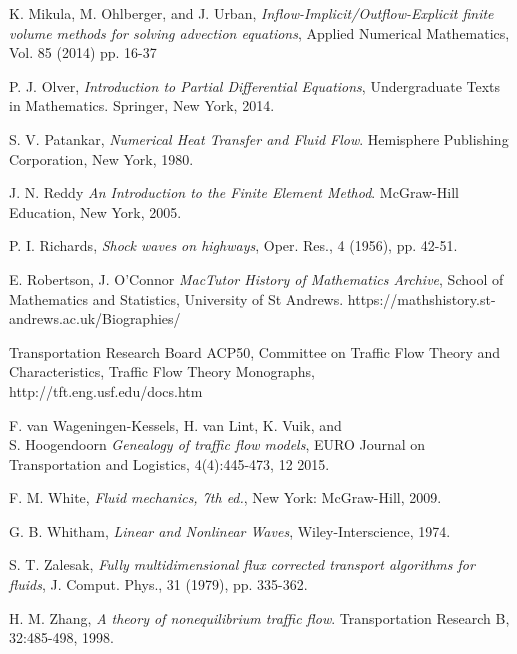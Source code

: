 \documentclass[../include.tex]{subfiles}
\begin{document}
\begin{thebibliography}{99}
	 {\sc K. Mikula, M. Ohlberger, and J. Urban},
	{\em Inflow-Implicit/Outflow-Explicit finite volume methods for solving advection equations}, Applied Numerical Mathematics, Vol. 85 (2014) pp. 16-37

	 {\sc P. J. Olver},
	{\em Introduction to Partial Differential Equations}, Undergraduate Texts in Mathematics. Springer, New York, 2014.

	 {\sc S. V. Patankar},
	{\em Numerical Heat Transfer and Fluid Flow}. Hemisphere Publishing Corporation, New York, 1980.

	 {\sc J. N. Reddy}
	{\em An Introduction to the Finite Element Method}. McGraw-Hill Education, New York, 2005.

	 {\sc P. I. Richards},
	{\em Shock waves on highways}, Oper. Res., 4 (1956), pp. 42-51.

	  {\sc E. Robertson, J. O'Connor}
	{\em MacTutor History of Mathematics Archive}, School of Mathematics and Statistics, University of St Andrews. https://mathshistory.st-andrews.ac.uk/Biographies/

	 Transportation Research Board ACP50, Committee on Traffic Flow Theory and Characteristics, Traffic Flow Theory Monographs,
	http://tft.eng.usf.edu/docs.htm

	 {\sc F. van Wageningen-Kessels, H. van Lint, K. Vuik, and \\S. Hoogendoorn}
	{\em Genealogy of traffic flow models}, EURO Journal on Transportation and Logistics, 4(4):445-473, 12 2015.

	 {\sc F. M. White},
	{\em Fluid mechanics, 7th ed.}, New York: McGraw-Hill, 2009.

	 {\sc G. B. Whitham},
	{\em Linear and Nonlinear Waves}, Wiley-Interscience, 1974.

	 {\sc S. T. Zalesak},
	{\em Fully multidimensional flux corrected transport algorithms for fluids}, J. Comput. Phys., 31 (1979), pp. 335-362.

	 {\sc H. M. Zhang},
	{\em A theory of nonequilibrium traffic flow}. Transportation Research B, 32:485-498, 1998.
\end{thebibliography}
\end{document}
